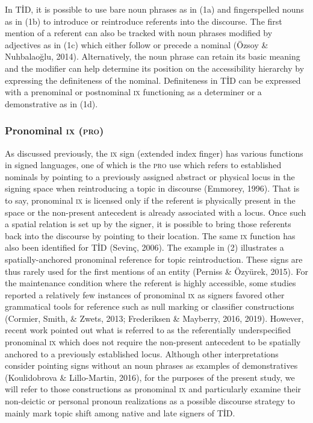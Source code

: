 \documentclass[
  english,
  doc,mask]{apa6}
\begin{document}
In TİD, it is possible to use bare noun phrases as in (1a) and fingerspelled nouns as in (1b) to introduce or reintroduce referents into the discourse. The first mention of a referent can also be tracked with noun phrases modified by adjectives as in (1c) which either follow or precede a nominal (Özsoy \& Nuhbalaoğlu, 2014). Alternatively, the noun phrase can retain its basic meaning and the modifier can help determine its position on the accessibility hierarchy by expressing the definiteness of the nominal. Definiteness in TİD can be expressed with a prenominal or postnominal \textsc{ix} functioning as a determiner or a demonstrative as in (1d).

\hypertarget{pronominal}{%
\subsubsection{\texorpdfstring{Pronominal \textsc{ix} (\textsc{pro})}{Pronominal  ()}}\label{pronominal}}

As discussed previously, the \textsc{ix} sign (extended index finger) has various functions in signed languages, one of which is the \textsc{pro} use which refers to established nominals by pointing to a previously assigned abstract or physical locus in the signing space when reintroducing a topic in discourse (Emmorey, 1996). That is to say, pronominal \textsc{ix} is licensed only if the referent is physically present in the space or the non-present antecedent is already associated with a locus. Once such a spatial relation is set up by the signer, it is possible to bring those referents back into the discourse by pointing to their location. The same \textsc{ix} function has also been identified for TİD (Sevinç, 2006). The example in (2) illustrates a spatially-anchored pronominal reference for topic reintroduction. These signs are thus rarely used for the first mentions of an entity (Perniss \& Özyürek, 2015). For the maintenance condition where the referent is highly accessible, some studies reported a relatively few instances of pronominal \textsc{ix} as signers favored other grammatical tools for reference such as null marking or classifier constructions (Cormier, Smith, \& Zwets, 2013; Frederiksen \& Mayberry, 2016, 2019). However, recent work pointed out what is referred to as the referentially underspecified pronominal \textsc{ix} which does not require the non-present antecedent to be spatially anchored to a previously established locus. Although other interpretations consider pointing signs without an noun phrases as examples of demonstratives (Koulidobrova \& Lillo-Martin, 2016), for the purposes of the present study, we will refer to those constructions as pronominal \textsc{ix} and particularly examine their non-deictic or personal pronoun realizations as a possible discourse strategy to mainly mark topic shift among native and late signers of TİD.
\end{document}
